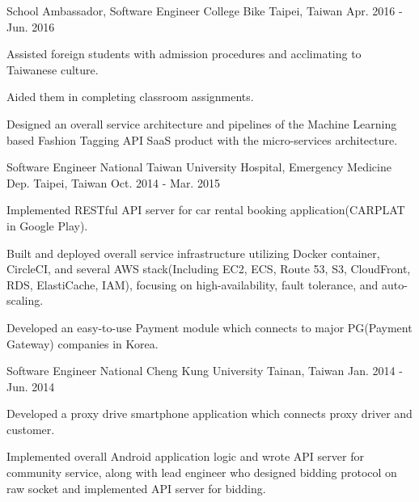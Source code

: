 \begin{cventries}
  \cventry
    {School Ambassador, Software Engineer} %
    {College Bike} %
    {Taipei, Taiwan} %
    {Apr. 2016 - Jun. 2016} %
    {
      \begin{cvitems} %
        \item {Assisted foreign students with admission procedures and acclimating to Taiwanese culture.}
        \item {Aided them in completing classroom assignments.}
        \item {Designed an overall service architecture and pipelines of the Machine Learning based Fashion Tagging API SaaS product with the micro-services architecture.}
      \end{cvitems}
    }

  \cventry
    {Software Engineer} %
    {National Taiwan University Hospital, Emergency Medicine Dep.} %
    {Taipei, Taiwan} %
    {Oct. 2014 - Mar. 2015} %
    {
      \begin{cvitems} %
        \item {Implemented RESTful API server for car rental booking application(CARPLAT in Google Play).}
        \item {Built and deployed overall service infrastructure utilizing Docker container, CircleCI, and several AWS stack(Including EC2, ECS, Route 53, S3, CloudFront, RDS, ElastiCache, IAM), focusing on high-availability, fault tolerance, and auto-scaling.}
        \item {Developed an easy-to-use Payment module which connects to major PG(Payment Gateway) companies in Korea.}
      \end{cvitems}
    }

  \cventry
    {Software Engineer} %
    {National Cheng Kung University} %
    {Tainan, Taiwan} %
    {Jan. 2014 - Jun. 2014} %
    {
      \begin{cvitems} %
        \item {Developed a proxy drive smartphone application which connects proxy driver and customer.}
        \item {Implemented overall Android application logic and wrote API server for community service, along with lead engineer who designed bidding protocol on raw socket and implemented API server for bidding.}
      \end{cvitems}
    }

\end{cventries}
